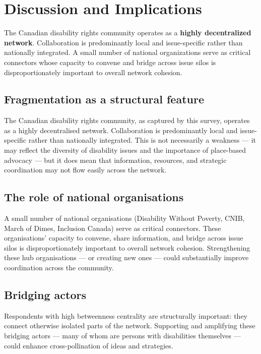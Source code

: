 \documentclass[
  letterpaper,
  DIV=11,
  numbers=noendperiod]{scrartcl}
\begin{document}
\section{Discussion and Implications}\label{discussion-and-implications}

The Canadian disability rights community operates as a \textbf{highly
decentralized network}. Collaboration is predominantly local and
issue-specific rather than nationally integrated. A small number of
national organizations serve as critical connectors whose capacity to
convene and bridge across issue silos is disproportionately important to
overall network cohesion.

\subsection{Fragmentation as a structural
feature}\label{fragmentation-as-a-structural-feature}

The Canadian disability rights community, as captured by this survey,
operates as a highly decentralised network. Collaboration is
predominantly local and issue-specific rather than nationally
integrated. This is not necessarily a weakness --- it may reflect the
diversity of disability issues and the importance of place-based
advocacy --- but it does mean that information, resources, and strategic
coordination may not flow easily across the network.

\subsection{The role of national
organisations}\label{the-role-of-national-organisations}

A small number of national organisations (Disability Without Poverty,
CNIB, March of Dimes, Inclusion Canada) serve as critical connectors.
These organisations' capacity to convene, share information, and bridge
across issue silos is disproportionately important to overall network
cohesion. Strengthening these hub organisations --- or creating new ones
--- could substantially improve coordination across the community.

\subsection{Bridging actors}\label{bridging-actors}

Respondents with high betweenness centrality are structurally important:
they connect otherwise isolated parts of the network. Supporting and
amplifying these bridging actors --- many of whom are persons with
disabilities themselves --- could enhance cross-pollination of ideas and
strategies.
\end{document}
